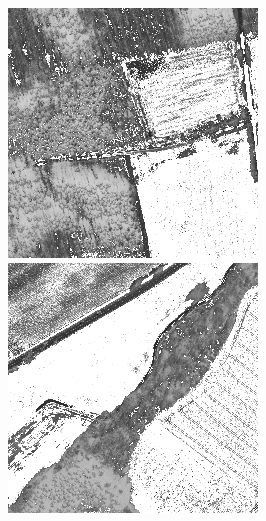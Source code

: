 \begin{figure}
    \includegraphics[width=\VegetationIndicesImageWidth]{images/vegetation/ndvi/4} \hfill
    \includegraphics[width=\VegetationIndicesImageWidth]{images/vegetation/ndvi/5}


\end{figure}
